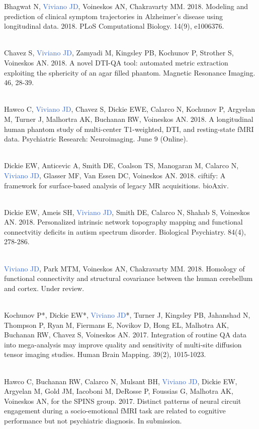 \documentclass[a4paper,11pt,oneside]{book}
\begin{document}
\begin{flushleft}
Bhagwat N, \textcolor{highlight}{Viviano JD}, Voineskos AN, Chakravarty MM. 2018. Modeling and prediction of clinical symptom trajectories in Alzheimer's disease using longitudinal data. 2018. PLoS Computational Biology. 14(9), e1006376. \\\

Chavez S, \textcolor{highlight}{Viviano JD}, Zamyadi M, Kingsley PB, Kochunov P, Strother S, Voineskos AN. 2018. A novel DTI-QA tool: automated metric extraction exploiting the sphericity of an agar filled phantom. Magnetic Resonance Imaging. 46, 28-39. \\\

Hawco C, \textcolor{highlight}{Viviano JD}, Chavez S, Dickie EWE, Calarco N, Kochunov P, Argyelan M, Turner J, Malhortra AK, Buchanan RW, Voineskos AN. 2018. A longitudinal human phantom study of multi-center T1-weighted, DTI, and resting-state fMRI data. Psychiatric Research: Neuroimaging. June 9 (Online).  \\\

Dickie EW, Anticevic A, Smith DE, Coalson TS, Manogaran M, Calarco N, \textcolor{highlight}{Viviano JD}, Glasser MF, Van Essen DC, Voineskos AN. 2018. ciftify: A framework for surface-based analysis of legacy MR acquisitions. bioAxiv. \\\

Dickie EW, Ameis SH, \textcolor{highlight}{Viviano JD}, Smith DE, Calarco N, Shahab S, Voineskos AN. 2018. Personalized intrinsic network topography mapping and functional connectvitiy deficits in autism spectrum disorder. Biological Psychiatry. 84(4), 278-286. \\\

\textcolor{highlight}{Viviano JD}, Park MTM, Voineskos AN, Chakravarty MM. 2018. Homology of functional connectivity and structural covariance between the human cerebellum and cortex. Under review. \\\

Kochunov P*, Dickie EW*, \textcolor{highlight}{Viviano JD}*, Turner J, Kingsley PB, Jahanshad N, Thompson P, Ryan M, Fiermans E, Novikov D, Hong EL, Malhotra AK, Buchanan RW, Chavez S, Voineskos AN. 2017. Integration of routine QA data into mega-analysis may improve quality and sensitivity of multi-site diffusion tensor imaging studies. Human Brain Mapping. 39(2), 1015-1023. \\\

Hawco C, Buchanan RW, Calarco N, Mulsant BH, \textcolor{highlight}{Viviano JD}, Dickie EW, Argyelan M, Gold JM, Iacoboni M, DeRosse P, Foussias G, Malhotra AK, Voineskos AN, for the SPINS group. 2017. Distinct patterns of neural circuit engagement during a socio-emotional fMRI task are related to cognitive performance but not psychiatric diagnosis. In submission. \\\


\end{flushleft}
\end{document}
